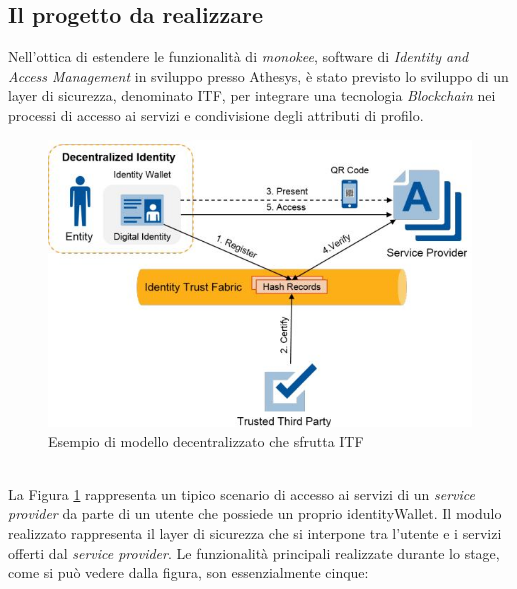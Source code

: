 \subsection{Il progetto da realizzare}
Nell'ottica di estendere le funzionalità di \emph{\gls{monokee}}\glsfirstoccur, software di \textit{Identity and Access Management} in sviluppo presso Athesys, è stato previsto lo sviluppo di un layer di sicurezza, denominato \gls{ITF}, per integrare una tecnologia \textit{Blockchain} nei processi di accesso ai servizi e condivisione degli attributi di profilo.
\begin{figure}[!h]
	\centering
	\includegraphics[scale=0.5]{immagini/ITF_Modello_Funzionale}
	\caption{Esempio di modello decentralizzato che sfrutta ITF}
	\label{fig:moduloITF}
\end{figure}
\\
La Figura \ref{fig:moduloITF} rappresenta un tipico scenario di accesso ai servizi di un \textit{service provider} da parte di un utente che possiede un proprio \gls{identityWallet}.
Il modulo realizzato rappresenta il layer di sicurezza che si interpone tra l'utente e i servizi offerti dal \textit{service provider}.
Le funzionalità principali realizzate durante lo stage, come si può vedere dalla figura, son essenzialmente cinque:
